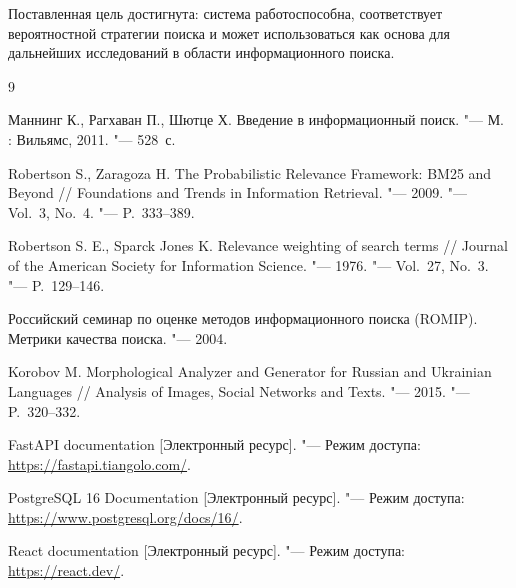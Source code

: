Поставленная цель достигнута: система работоспособна, соответствует вероятностной стратегии поиска и может использоваться как основа для дальнейших исследований в области информационного поиска.

\begin{thebibliography}{9}

	Маннинг К., Рагхаван П., Шютце Х. Введение в информационный поиск. "--- М. : Вильямс, 2011. "--- 528~с.

	Robertson S., Zaragoza H. The Probabilistic Relevance Framework: BM25 and Beyond // Foundations and Trends in Information Retrieval. "--- 2009. "--- Vol.~3, No.~4. "--- P.~333--389.

	Robertson S. E., Sparck Jones K. Relevance weighting of search terms // Journal of the American Society for Information Science. "--- 1976. "--- Vol.~27, No.~3. "--- P.~129--146.

	Российский семинар по оценке методов информационного поиска (ROMIP). Метрики качества поиска. "--- 2004.

	Korobov M. Morphological Analyzer and Generator for Russian and Ukrainian Languages // Analysis of Images, Social Networks and Texts. "--- 2015. "--- P.~320--332.

	FastAPI documentation [Электронный ресурс]. "--- Режим доступа: \url{https://fastapi.tiangolo.com/}.

	PostgreSQL 16 Documentation [Электронный ресурс]. "--- Режим доступа: \url{https://www.postgresql.org/docs/16/}.

	React documentation [Электронный ресурс]. "--- Режим доступа: \url{https://react.dev/}.
\end{thebibliography}
